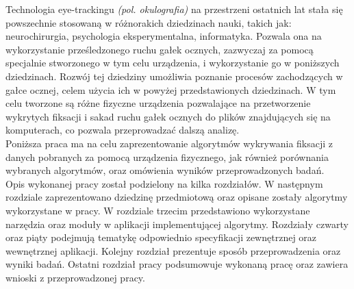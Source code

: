 Technologia eye-trackingu \textit{(pol. okulografia)} na przestrzeni ostatnich lat stała się powszechnie stosowaną w różnorakich dziedzinach nauki, takich jak: neurochirurgia, psychologia eksperymentalna, informatyka. Pozwala ona na wykorzystanie prześledzonego ruchu gałek ocznych, zazwyczaj za pomocą specjalnie stworzonego w tym celu urządzenia, i wykorzystanie go w poniższych dziedzinach. Rozwój tej dziedziny umożliwia poznanie procesów zachodzących w gałce ocznej, celem użycia ich w powyżej przedstawionych dziedzinach. W tym celu tworzone są różne fizyczne urządzenia pozwalające na przetworzenie wykrytych fiksacji i sakad ruchu gałek ocznych do plików znajdujących się na komputerach, co pozwala przeprowadzać dalszą analizę.\\
Poniższa praca ma na celu zaprezentowanie algorytmów wykrywania fiksacji z danych pobranych za pomocą urządzenia fizycznego, jak również porównania wybranych algorytmów, oraz omówienia wyników przeprowadzonych badań.\\
Opis wykonanej pracy został podzielony na kilka rozdziałów. W następnym rozdziale zaprezentowano dziedzinę przedmiotową oraz opisane zostały algorytmy wykorzystane w pracy. W rozdziale trzecim przedstawiono wykorzystane narzędzia oraz moduły w aplikacji implementującej algorytmy. Rozdziały czwarty oraz piąty podejmują tematykę odpowiednio specyfikacji zewnętrznej oraz wewnętrznej aplikacji. Kolejny rozdział prezentuje sposób przeprowadzenia oraz wyniki badań. Ostatni rozdział pracy podsumowuje wykonaną pracę oraz zawiera wnioski z przeprowadzonej pracy.